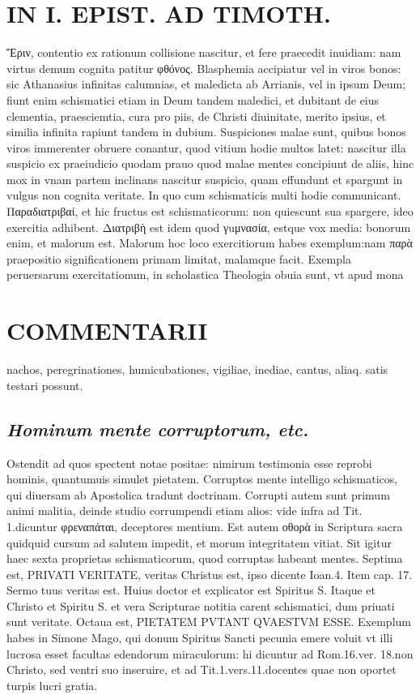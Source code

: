 \documentclass{article}
\begin{document}
\begin{pages}
\section*{IN I. EPIST. AD TIMOTH. }
\marginpar{[ p.153 ]}\pstart Ἔριν, contentio ex rationum collisione nascitur, et fere praecedit inuidiam: nam virtus demum cognita patitur φθόνος.  \pend\pstart Blasphemia accipiatur vel in viros bonos: sic Athanasius infinitas calumnias, et maledicta ab Arrianis, vel in ipsum Deum; fiunt enim schismatici etiam in Deum tandem maledici, et dubitant de eius clementia, praesciemtia, cura pro piis, de Christi diuinitate, merito ipsius, et similia infinita rapiunt tandem in dubium.  \pend\pstart Suspiciones malae sunt, quibus bonos viros immerenter obruere conantur, quod vitium hodie multos latet: nascitur illa suspicio ex praeiudicio quodam prauo quod malae mentes concipiunt de aliis, hinc mox in vnam partem inclinans nascitur suspicio, quam effundunt et spargunt in vulgus non cognita veritate. In quo cum schismaticis multi hodie communicant.  \pend\pstart Παραδιατριβαί, et hic fructus est schismaticorum: non quiescunt sua spargere, ideo exercitia adhibent. Διατριβὴ est idem quod γuμνασία, estque vox media: bonorum enim, et malorum est. Malorum hoc loco exercitiorum habes exemplum:nam παρὰ praepositio significationem primam limitat, malamque facit. Exempla peruersarum exercitationum, in scholastica Theologia obuia sunt, vt apud mona\pend
\section*{COMMENTARII }
\marginpar{[ p.154 ]}\pstart nachos, peregrinationes, humicubationes, vigiliae, inediae, cantus, aliaq. satis testari possunt.  \pend
{}
{}
\subsection*{\textit{Hominum mente corruptorum, etc. }}\pstart Ostendit ad quos spectent notae positae: nimirum testimonia esse reprobi hominis, quantumuis simulet pietatem. Corruptos mente intelligo schismaticos, qui diuersam ab Apostolica tradunt doctrinam. Corrupti autem sunt primum animi malitia, deinde studio corrumpendi etiam alios: vide infra ad Tit. 1.dicuntur φρεναπάται, deceptores mentium.  \pend\pstart Est autem οθορὰ in Scriptura sacra quidquid cursum ad salutem impedit, et morum integritatem vitiat. Sit igitur haec sexta proprietas schismaticorum, quod corruptas habeant mentes.  \pend\pstart Septima est, PRIVATI VERITATE, veritas Christus est, ipso dicente Ioan.4. Item cap. 17. Sermo tuus veritas est. Huius doctor et explicator est Spiritus S. Itaque et Christo et Spiritu S. et vera Scripturae notitia carent schismatici, dum priuati sunt veritate.  \pend\pstart Octaua est, PIETATEM PVTANT QVAESTVM ESSE. Exemplum habes in Simone Mago, qui donum Spiritus Sancti pecunia emere voluit vt illi lucrosa esset facultas edendorum miraculorum: hi dicuntur ad Rom.16.ver. 18.non Christo, sed ventri suo inseruire, et ad Tit.1.vers.11.docentes quae non oportet turpis lucri gratia.  \pend

\end{pages}
\end{document}
